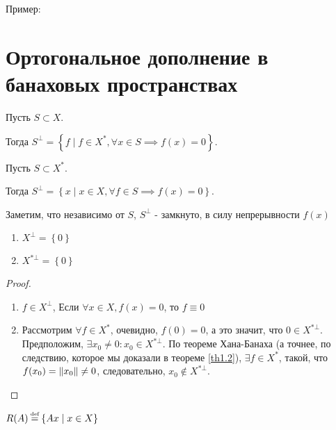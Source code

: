 Пример: \todo

\section{Ортогональное дополнение в банаховых пространствах}


\begin{definition}
	Пусть $S \subset X$.

	 Тогда $S^\bot = \left\{ f \mid f \in X^*, \forall x \in S \implies f(x) = 0 \right\}$.
\end{definition}

\begin{definition}
	Пусть $S \subset X^*$.

	 Тогда $S^\bot = \left\{ x \mid x \in X, \forall f \in S \implies f(x) = 0 \right\}$.
\end{definition}
Заметим, что независимо от $S$, $S^\bot$ - замкнуто, в силу непрерывности $f(x)$

\begin{statement}
	\begin{minipage}[t]{\linegoal}
	\begin{enumerate}[leftmargin=*]
		\item 	$X^\bot = \left\{ 0\right\}$
		\item   $X^{*\bot} = \left\{ 0\right\}$
	\end{enumerate}
	\end{minipage}
\end{statement}
\begin{proof}
	\begin{enumerate}[leftmargin=*]
		\item $f \in X^\bot$, Если $\forall x \in X, f(x) = 0 $, то $f \equiv 0$
		\item Рассмотрим $\forall f \in X^*$, очевидно, $f(0) = 0$, а это значит, что
		$0 \in X^{*\bot}$. Предположим, $\exists x_0 \neq 0 : x_0 \in X^{*\bot}$.
		По теореме Хана-Банаха (а точнее, по следствию, которое мы доказали в теореме \ref{th1.2}), 
		$\exists f \in X^*$, такой, что
		$f(x_0) = \left\|x_0\right\| \neq 0$, следовательно, $x_0 \not\in X^{*\bot}$.
	\end{enumerate}
\end{proof}

\begin{definition}
	$R(A) \defeq \left\{ Ax \mid x \in X\right\}$
\end{definition}


